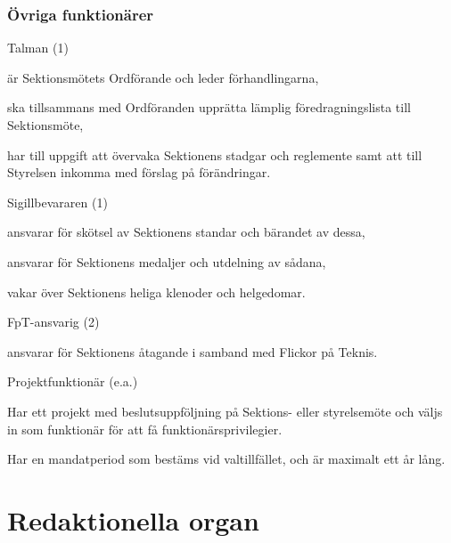 \documentclass[10pt]{article}
\renewcommand{\thesubsection}{\arabic{section}:\Alph{subsection}}
\begin{document}
\subsubsection{Övriga funktionärer}
\begin{emptylist}
    \item Talman (1)
        \begin{dashlist}
            \item är Sektionsmötets Ordförande och leder förhandlingarna,
            \item ska tillsammans med Ordföranden upprätta lämplig
                föredragningslista till Sektionsmöte,
            \item har till uppgift att övervaka Sektionens stadgar och
                reglemente samt att till Styrelsen inkomma med förslag på
                förändringar.
        \end{dashlist}
    \item Sigillbevararen (1)
        \begin{dashlist}
            \item ansvarar för skötsel av Sektionens standar och bärandet av
                dessa,
            \item ansvarar för Sektionens medaljer och utdelning av sådana,
            \item vakar över Sektionens heliga klenoder och helgedomar.
        \end{dashlist}
    \item FpT-ansvarig (2)
        \begin{dashlist}
            \item ansvarar för Sektionens åtagande i samband med Flickor på
                Teknis.
        \end{dashlist}
    \item Projektfunktionär (e.a.)
    \begin{dashlist}
      \item Har ett projekt med beslutsuppföljning på Sektions- eller styrelsemöte och väljs in som funktionär för att få funktionärsprivilegier.
      \item Har en mandatperiod som bestäms vid valtillfället, och är maximalt ett år lång.
    \end{dashlist}
\end{emptylist}
\renewcommand*\thesubsection{\arabic{section}:\Alph{subsection}}
\section{Redaktionella organ}
\end{document}
